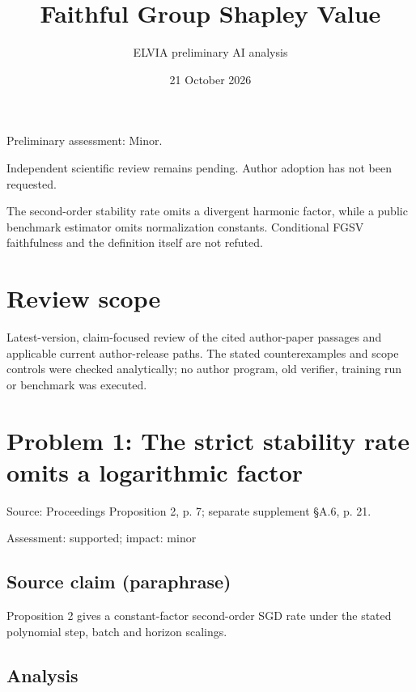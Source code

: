 \documentclass[11pt]{article}
\begin{document}
\title{Faithful Group Shapley Value}

\author{ELVIA preliminary AI analysis}\date{21 October 2026}\maketitle

Preliminary assessment: Minor.\par

Independent scientific review remains pending. Author adoption has not been requested.

The second-order stability rate omits a divergent harmonic factor, while a public benchmark estimator omits normalization constants. Conditional FGSV faithfulness and the definition itself are not refuted.

\section*{Review scope}

Latest-version, claim-focused review of the cited author-paper passages and applicable current author-release paths. The stated counterexamples and scope controls were checked analytically; no author program, old verifier, training run or benchmark was executed.

\section*{Problem 1: The strict stability rate omits a logarithmic factor}

Source: Proceedings Proposition 2, p. 7; separate supplement §A.6, p. 21.

Assessment: supported; impact: minor

\subsection*{Source claim (paraphrase)}

Proposition 2 gives a constant-factor second-order SGD rate under the stated polynomial step, batch and horizon scalings.

\subsection*{Analysis}
\end{document}
